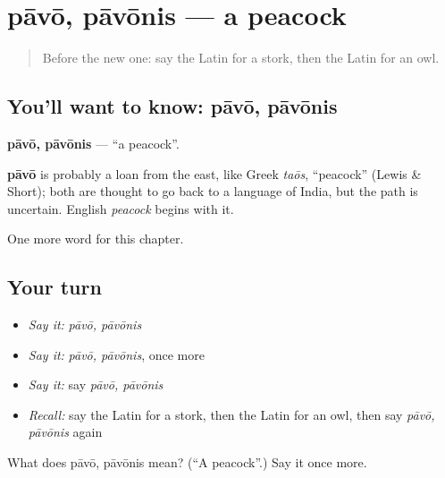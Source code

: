 \section[pāvō, pāvōnis]{pāvō, pāvōnis — a peacock}

\label{lesson:LA-C192-pavo}



\begin{quote}
Before the new one: say the Latin for a stork, then the Latin for an owl.
\end{quote}

\subsection*{You'll want to know: pāvō, pāvōnis}
\textbf{pāvō, pāvōnis} — \textquotedblleft{}a peacock\textquotedblright{}.

\begin{cousinweb}
\textbf{pāvō} is probably a loan from the east, like Greek \emph{taōs}, \textquotedblleft{}peacock\textquotedblright{} (Lewis \& Short); both are thought to go back to a language of India, but the path is uncertain. English \emph{peacock} begins with it.
\end{cousinweb}

\begin{grammarlens}[title={What you've built}]
One more word for this chapter.
\end{grammarlens}

\subsection*{Your turn}
\begin{itemize}
\raggedright
  \item \emph{Say it:} \emph{pāvō, pāvōnis}
  \item \emph{Say it:} \emph{pāvō, pāvōnis}, once more
  \item \emph{Say it:} say \emph{pāvō, pāvōnis}
  \item \emph{Recall:} say the Latin for a stork, then the Latin for an owl, then say \emph{pāvō, pāvōnis} again
\end{itemize}

\begin{tcolorbox}[breakable,colback=teal!4,colframe=teal!35!black,title={Before you move on}]
What does pāvō, pāvōnis mean? (\textquotedblleft{}A peacock\textquotedblright{}.) Say it once more.
\end{tcolorbox}
